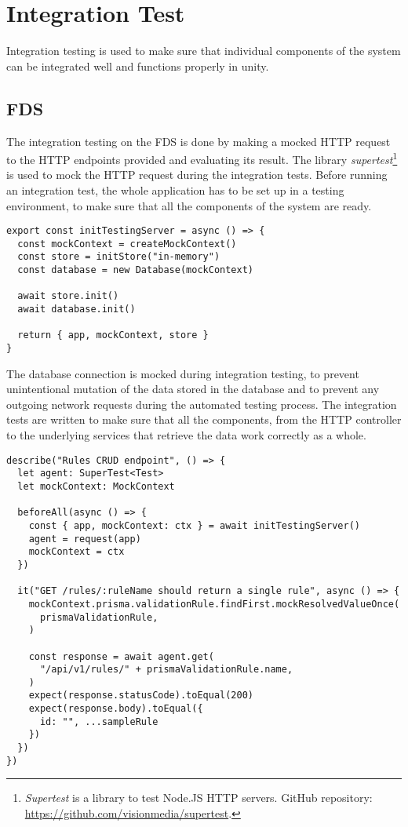 \section{Integration Test}

  Integration testing is used to make sure that individual components of the system can be integrated well and functions properly in unity. 

  \subsection{FDS}

    The integration testing on the FDS is done by making a mocked HTTP request to the HTTP endpoints provided and evaluating its result. The library \emph{supertest}\footnote{\emph{Supertest} is a library to test Node.JS HTTP servers. GitHub repository: \url{https://github.com/visionmedia/supertest}.} is used to mock the HTTP request during the integration tests. Before running an integration test, the whole application has to be set up in a testing environment, to make sure that all the components of the system are ready.

    \begin{lstlisting}[style=es6, caption={Setting up a testing server environment for integration test (TypeScript)}]
export const initTestingServer = async () => {
  const mockContext = createMockContext()
  const store = initStore("in-memory")
  const database = new Database(mockContext)

  await store.init()
  await database.init()

  return { app, mockContext, store }
}
    \end{lstlisting}

    The database connection is mocked during integration testing, to prevent unintentional mutation of the data stored in the database and to prevent any outgoing network requests during the automated testing process. The integration tests are written to make sure that all the components, from the HTTP controller to the underlying services that retrieve the data work correctly as a whole.

    \begin{lstlisting}[style=es6, caption={Integration testing on the FDS (TypeScript)}]
describe("Rules CRUD endpoint", () => {
  let agent: SuperTest<Test>
  let mockContext: MockContext

  beforeAll(async () => {
    const { app, mockContext: ctx } = await initTestingServer()
    agent = request(app)
    mockContext = ctx
  })

  it("GET /rules/:ruleName should return a single rule", async () => {
    mockContext.prisma.validationRule.findFirst.mockResolvedValueOnce(
      prismaValidationRule,
    )

    const response = await agent.get(
      "/api/v1/rules/" + prismaValidationRule.name,
    )
    expect(response.statusCode).toEqual(200)
    expect(response.body).toEqual({
      id: "", ...sampleRule 
    })
  })
})
    \end{lstlisting}

